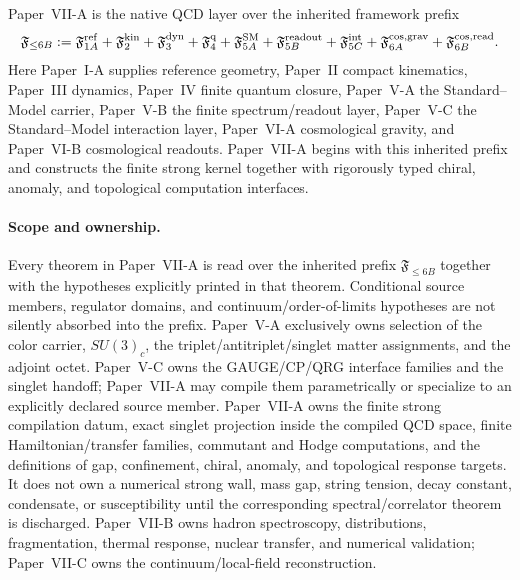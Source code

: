 \documentclass[12pt,a4paper]{article}
\begin{document}
Paper~VII-A is the native QCD layer over the inherited framework prefix
\begin{equation}
\label{p10:eq:framework-prefix-fle9}
\mathfrak F_{\le 6B}
:=
\mathfrak F_{1A}^{\rm ref}
+
\mathfrak F_{2}^{\rm kin}
+
\mathfrak F_{3}^{\rm dyn}
+
\mathfrak F_{4}^{\rm q}
+
\mathfrak F_{5A}^{\rm SM}
+
\mathfrak F_{5B}^{\rm readout}
+
\mathfrak F_{5C}^{\rm int}+\mathfrak F_{6A}^{\rm cos,grav}+\mathfrak F_{6B}^{\rm cos,read}.
\end{equation}
Here Paper~I-A \cite{Kugelmann2026a} supplies reference geometry, Paper~II compact kinematics, Paper~III dynamics, Paper~IV finite quantum closure, Paper~V-A the Standard--Model carrier, Paper~V-B the finite spectrum/readout layer, Paper~V-C the Standard--Model interaction layer, Paper~VI-A cosmological gravity, and Paper~VI-B cosmological readouts.  Paper~VII-A begins with this inherited prefix and constructs the finite strong kernel together with rigorously typed chiral, anomaly, and topological computation interfaces.

\paragraph{Scope and ownership.}
Every theorem in Paper~VII-A is read over the inherited prefix \(\mathfrak F_{\le 6B}\) together with the hypotheses explicitly printed in that theorem.  Conditional source members, regulator domains, and continuum/order-of-limits hypotheses are not silently absorbed into the prefix.  Paper~V-A exclusively owns selection of the color carrier,
\(SU(3)_c\), the triplet/antitriplet/singlet matter assignments, and the adjoint
octet.  Paper~V-C owns the GAUGE/CP/QRG interface families and the singlet handoff; Paper~VII-A may compile them parametrically or specialize to an explicitly declared source member.  Paper~VII-A owns the finite strong compilation datum, exact singlet projection inside the compiled QCD space, finite Hamiltonian/transfer families, commutant and Hodge computations, and the definitions of gap, confinement, chiral, anomaly, and topological response targets.  It does not own a numerical strong wall, mass gap, string tension, decay constant, condensate, or susceptibility until the corresponding spectral/correlator theorem is discharged.  Paper~VII-B owns hadron spectroscopy, distributions,
fragmentation, thermal response, nuclear transfer, and numerical validation;
Paper~VII-C owns the continuum/local-field reconstruction.
\end{document}
